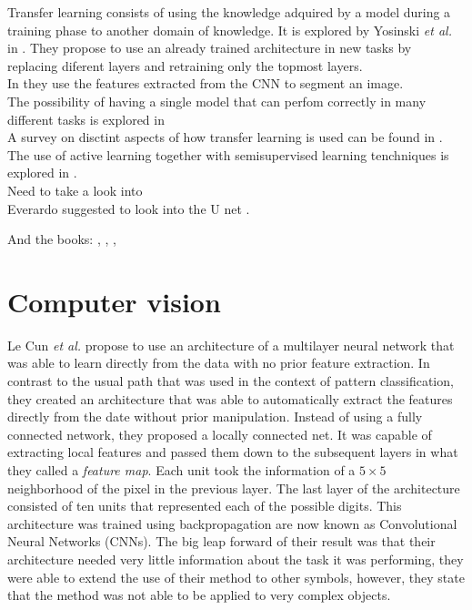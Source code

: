 Transfer learning consists of using the knowledge adquired by a model during a training phase to another domain of knowledge. It is explored by Yosinski \textit{et al.} in \cite{DBLP:journals/corr/YosinskiCBL14}. They propose to use an already trained architecture in new tasks by replacing diferent layers and retraining only the topmost layers. \\

In \cite{DBLP:journals/corr/LongSD14} they use the features extracted from the CNN to segment an image.\\

The possibility of having a single model that can perfom correctly in many different tasks is explored in \cite{DBLP:journals/corr/KaiserGSVPJU17}\\

A survey on disctint aspects of how transfer learning is used can be found in \cite{5288526}.\\

The use of active learning together with semisupervised learning tenchniques is explored in \cite{7956153}.\\

Need to take a look into \cite{DBLP:journals/corr/ChenPKMY14}\\

Everardo suggested to look into the U net \cite{DBLP:journals/corr/RonnebergerFB15}.


And the books: \cite{canty2014image}, \cite{richards2013remote}, \cite{tso2009classification} ,\cite{hastie01statisticallearning}




\section{Computer vision}

Le Cun \textit{et al.} \cite{119325} propose to use an architecture of a multilayer neural network that was able to learn directly from the data with no prior feature extraction. In contrast to the usual path that was used in the context of pattern classification, they created an architecture that was able to automatically extract the features directly from the date without prior manipulation. Instead of using a fully connected network, they proposed a locally connected net. It was capable of extracting local features and passed them down to the subsequent layers in what they called a \textit{feature map}. Each unit took the information of a $5\times 5$ neighborhood of the pixel in the previous layer. The last layer of the architecture consisted of ten units that represented each of the possible digits. This architecture was trained using backpropagation are now known as Convolutional Neural Networks (CNNs). The big leap forward of their result was that their architecture needed very little information about the task it was performing, they were able to extend the use of their method to other symbols, however, they state that the method was not able to be applied to very complex objects.\\


